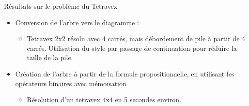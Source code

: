 \documentclass{beamer}
\begin{document}
\begin{frame}{Résultats sur le problème du Tetravex}
\begin{itemize}
\item Conversion de l'arbre vers le diagramme : 
\begin{itemize}
\item Tetravex $2$x$2$ résolu avec 4 carrés, mais débordement de pile à partir de 4 carrés. Utilisation du style par passage de continuation pour réduire la taille de la pile.
\end{itemize}
\item Création de l'arbre à partir de la formule propositionnelle, en utilisant les opérateurs binaires avec mémoïsation
\begin{itemize}
\item Résolution d'un tetravex $4$x$4$ en 5 secondes environ.
\end{itemize}
\end{itemize}
\end{frame}
	
\end{document}
